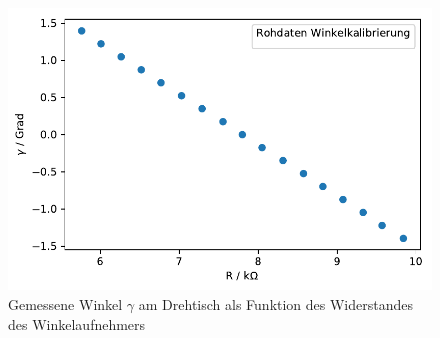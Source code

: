 \documentclass[12pt,a4paper]{article}
\begin{document}
\begin{figure}
\centering
\includegraphics[scale=1]{Bilder/Winkelkal_Rohdaten.pdf}
\caption{Gemessene Winkel $\gamma$ am Drehtisch als Funktion des Widerstandes des Winkelaufnehmers}
\label{Winkelkalibrierung_Rohdaten}
\end{figure}
\end{document}
